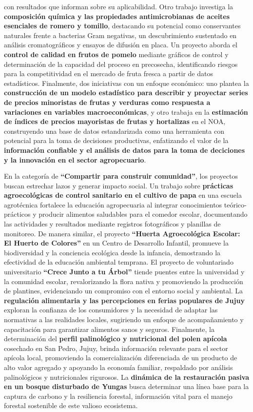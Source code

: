 \documentclass[
  spanish,
  letterpaper,
  DIV=11,
  numbers=noendperiod]{scrreprt}
\begin{document}
con resultados que informan sobre su aplicabilidad. Otro trabajo
investiga la \textbf{composición química y las propiedades
antimicrobianas de aceites esenciales de romero y tomillo}, destacando
su potencial como conservantes naturales frente a bacterias Gram
negativas, un descubrimiento sustentado en análisis cromatográficos y
ensayos de difusión en placa. Un proyecto aborda el \textbf{control de
calidad en frutos de pomelo} mediante gráficos de control y
determinación de la capacidad del proceso en precosecha, identificando
riesgos para la competitividad en el mercado de fruta fresca a partir de
datos estadísticos. Finalmente, dos iniciativas con un enfoque
económico: uno plantea la \textbf{construcción de un modelo estadístico
para describir y proyectar series de precios minoristas de frutas y
verduras como respuesta a variaciones en variables macroeconómicas}, y
otro trabaja en la \textbf{estimación de índices de precios mayoristas
de frutas y hortalizas} en el NOA, construyendo una base de datos
estandarizada como una herramienta con potencial para la toma de
decisiones productivas, enfatizando el valor de la \textbf{información
confiable y el análisis de datos para la toma de deciciones y la
innovación en el sector agropecuario}.

En la categoría de \textbf{``Compartir para construir comunidad''}, los
proyectos buscan estrechar lazos y generar impacto social. Un trabajo
sobre \textbf{prácticas agroecológicas de control sanitario en el
cultivo de papa} en una escuela agrotécnica fortalece la educación
agropecuaria al integrar conocimientos teórico-prácticos y producir
alimentos saludables para el comedor escolar, documentando las
actividades y resultados mediante registros fotográficos y planillas de
monitoreo. De manera similar, el proyecto \textbf{``Huerta Agroecológica
Escolar: El Huerto de Colores''} en un Centro de Desarrollo Infantil,
promueve la biodiversidad y la conciencia ecológica desde la infancia,
demostrando la efectividad de la educación ambiental temprana. El
proyecto de voluntariado universitario \textbf{``Crece Junto a tu
Árbol''} tiende puentes entre la universidad y la comunidad escolar,
revalorizando la flora nativa y promoviendo la producción de plantines,
evidenciando un compromiso con el entorno social y ambiental. La
\textbf{regulación alimentaria y las percepciones en ferias populares de
Jujuy} exploran la confianza de los consumidores y la necesidad de
adaptar las normativas a las realidades locales, sugiriendo un enfoque
de acompañamiento y capacitación para garantizar alimentos sanos y
seguros. Finalmente, la determinación del \textbf{perfil palinológico y
nutricional del polen apícola} cosechado en San Pedro, Jujuy, brinda
información relevante para el sector apícola local, promoviendo la
comercialización diferenciada de un producto de alto valor agregado y
apoyando la economía familiar, respaldado por análisis palinológicos y
nutricionales rigurosos. La \textbf{dinámica de la restauración pasiva
en un bosque disturbado de Yungas} busca determinar una línea base para
la captura de carbono y la resiliencia forestal, información vital para
el manejo forestal sostenible de este valioso ecosistema.
\end{document}
